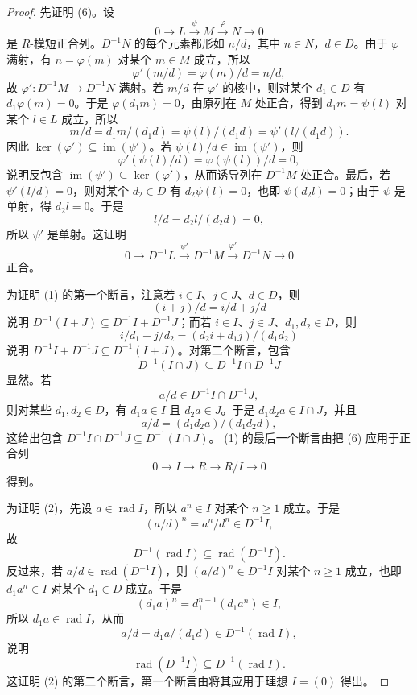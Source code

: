 \begin{proof}
	先证明 (6)。设
	\[
	0\longrightarrow L\overset{\psi}{\longrightarrow} M\overset{\varphi}{\longrightarrow} N\longrightarrow0
	\]
	是 $R$-模短正合列。$D^{-1}N$ 的每个元素都形如 $n/d$，其中 $n\in N$，$d\in D$。由于 $\varphi$ 满射，有 $n=\varphi(m)$ 对某个 $m\in M$ 成立，所以
	\[
	\varphi'(m/d)=\varphi(m)/d=n/d,
	\]
	故 $\varphi':D^{-1}M\to D^{-1}N$ 满射。若 $m/d$ 在 $\varphi'$ 的核中，则对某个 $d_1\in D$ 有 $d_1\varphi(m)=0$。于是 $\varphi(d_1m)=0$，由原列在 $M$ 处正合，得到 $d_1m=\psi(l)$ 对某个 $l\in L$ 成立，所以
	\[
	m/d=d_1m/(d_1d)=\psi(l)/(d_1d)=\psi'(l/(d_1d)).
	\]
	因此 $\ker(\varphi')\subseteq\operatorname{im}(\psi')$。若 $\psi(l)/d\in\operatorname{im}(\psi')$，则
	\[
	\varphi'(\psi(l)/d)=\varphi(\psi(l))/d=0,
	\]
	说明反包含 $\operatorname{im}(\psi')\subseteq\ker(\varphi')$，从而诱导列在 $D^{-1}M$ 处正合。最后，若 $\psi'(l/d)=0$，则对某个 $d_2\in D$ 有 $d_2\psi(l)=0$，也即 $\psi(d_2l)=0$；由于 $\psi$ 是单射，得 $d_2l=0$。于是
	\[
	l/d=d_2l/(d_2d)=0,
	\]
	所以 $\psi'$ 是单射。这证明
	\[
	0\longrightarrow D^{-1}L\overset{\psi'}{\longrightarrow}D^{-1}M\overset{\varphi'}{\longrightarrow}D^{-1}N\longrightarrow0
	\]
	正合。
	
	为证明 (1) 的第一个断言，注意若 $i\in I$、$j\in J$、$d\in D$，则
	\[
	(i+j)/d=i/d+j/d
	\]
	说明 $D^{-1}(I+J)\subseteq D^{-1}I+D^{-1}J$；而若 $i\in I$、$j\in J$、$d_1,d_2\in D$，则
	\[
	i/d_1+j/d_2=(d_2i+d_1j)/(d_1d_2)
	\]
	说明 $D^{-1}I+D^{-1}J\subseteq D^{-1}(I+J)$。对第二个断言，包含
	\[
	D^{-1}(I\cap J)\subseteq D^{-1}I\cap D^{-1}J
	\]
	显然。若
	\[
	a/d\in D^{-1}I\cap D^{-1}J,
	\]
	则对某些 $d_1,d_2\in D$，有 $d_1a\in I$ 且 $d_2a\in J$。于是 $d_1d_2a\in I\cap J$，并且
	\[
	a/d=(d_1d_2a)/(d_1d_2d),
	\]
	这给出包含 $D^{-1}I\cap D^{-1}J\subseteq D^{-1}(I\cap J)$。 (1) 的最后一个断言由把 (6) 应用于正合列
	\[
	0\longrightarrow I\longrightarrow R\longrightarrow R/I\longrightarrow0
	\]
	得到。
	
	为证明 (2)，先设 $a\in\operatorname{rad}I$，所以 $a^n\in I$ 对某个 $n\ge1$ 成立。于是
	\[
	(a/d)^n=a^n/d^n\in D^{-1}I,
	\]
	故
	\[
	D^{-1}(\operatorname{rad}I)\subseteq\operatorname{rad}(D^{-1}I).
	\]
	反过来，若 $a/d\in\operatorname{rad}(D^{-1}I)$，则 $(a/d)^n\in D^{-1}I$ 对某个 $n\ge1$ 成立，也即 $d_1a^n\in I$ 对某个 $d_1\in D$ 成立。于是
	\[
	(d_1a)^n=d_1^{n-1}(d_1a^n)\in I,
	\]
	所以 $d_1a\in\operatorname{rad}I$，从而
	\[
	a/d=d_1a/(d_1d)\in D^{-1}(\operatorname{rad}I),
	\]
	说明
	\[
	\operatorname{rad}(D^{-1}I)\subseteq D^{-1}(\operatorname{rad}I).
	\]
	这证明 (2) 的第二个断言，第一个断言由将其应用于理想 $I=(0)$ 得出。
	

\end{proof}
